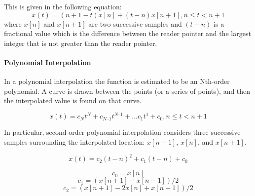 This is given in the following equation:
\[
 x(t) = (n + 1 - t)x[n] + (t-n)x[n+1], 				n \leq t< n + 1
\]
where $x[n]$ and $x[n+1]$ are two successive  samples and $ (t-n) $ is a fractional value which is the difference between the reader pointer and the largest integer that is not greater than the reader pointer.

\paragraph{Polynomial Interpolation}
In a polynomial interpolation the function is estimated to be an Nth-order polynomial. A curve is drawn between the points (or a series of points), and then the interpolated value is found on that curve.~\cite{pirkle2013designing}

\[
 x(t) = c_{N}t^{N} + c_{N–1}t^{N–1} + ... c_{1}t^{1} + c_{0}, 				n \leq t< n + 1
 \]

In particular, second-order polynomial interpolation considers three successive samples surrounding the interpolated location: $x[n-1]$, $x[n]$, and $x[n+1]$. 

\[
x(t) = c_{2}(t-n)^{2} + c_{1}(t-n) + c_{0}
\]

\[
c_{0} = x[n]
\]
\[
c_{1} = (x[n+1] - x[n-1])/2
\]
\[
c_{2} = (x[n+1] - 2x[n] + x[n-1])/2
\]



